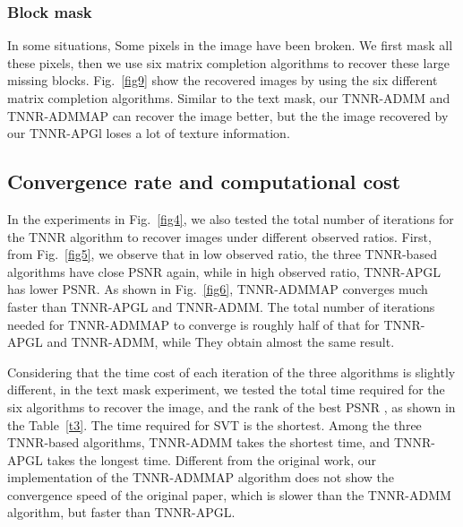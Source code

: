 \documentclass[fontset=windows]{article}
\begin{document}
{\subsubsection{Block mask}
In some situations, Some pixels in the image have been broken. We first mask all these pixels, then we use six matrix completion algorithms to recover these large missing blocks.
Fig.~\ref{fig9} show the recovered images by using the six different matrix completion algorithms.
Similar to the text mask, our TNNR-ADMM and TNNR-ADMMAP can recover the image better, but the the image recovered by our TNNR-APGl loses a lot of texture information.

\subsection{Convergence rate and computational cost}
In the experiments in Fig.~\ref{fig4}, we also tested the total number of iterations for the TNNR algorithm to recover images under different observed ratios. First, from Fig.~\ref{fig5}, we observe that in low observed ratio, the three TNNR-based algorithms have close PSNR again, while in high observed ratio, TNNR-APGL has lower PSNR. As shown in Fig.~\ref{fig6}, TNNR-ADMMAP converges much faster than TNNR-APGL and TNNR-ADMM. The total number of iterations needed for TNNR-ADMMAP to converge is roughly half of that for TNNR-APGL and TNNR-ADMM, while They obtain almost the same result. 

Considering that the time cost of each iteration of the three algorithms is slightly different, in the text mask experiment, we tested the total time required for the six algorithms to recover the image, and the rank of the best PSNR , as shown in the Table~\ref{t3}. The time required for SVT is the shortest. Among the three TNNR-based algorithms, TNNR-ADMM takes the shortest time, and TNNR-APGL takes the longest time. Different from the original work, our implementation of the TNNR-ADMMAP algorithm does not show the convergence speed of the original paper, which is slower than the TNNR-ADMM algorithm, but faster than TNNR-APGL.

}
\end{document}
